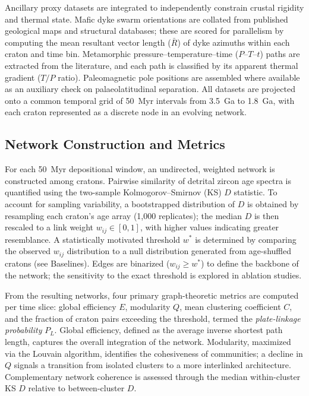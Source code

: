 \documentclass{article}
\begin{document}
Ancillary proxy datasets are integrated to independently constrain crustal rigidity and thermal state. Mafic dyke swarm orientations are collated from published geological maps and structural databases; these are scored for parallelism by computing the mean resultant vector length ($\bar{R}$) of dyke azimuths within each craton and time bin. Metamorphic pressure–temperature–time ($P$–$T$–$t$) paths are extracted from the literature, and each path is classified by its apparent thermal gradient ($T/P$ ratio). Paleomagnetic pole positions are assembled where available as an auxiliary check on palaeolatitudinal separation. All datasets are projected onto a common temporal grid of 50~Myr intervals from 3.5~Ga to 1.8~Ga, with each craton represented as a discrete node in an evolving network.

\subsection{Network Construction and Metrics}
For each 50~Myr depositional window, an undirected, weighted network is constructed among cratons. Pairwise similarity of detrital zircon age spectra is quantified using the two-sample Kolmogorov–Smirnov (KS) $D$ statistic. To account for sampling variability, a bootstrapped distribution of $D$ is obtained by resampling each craton's age array (1,000 replicates); the median $D$ is then rescaled to a link weight $w_{ij} \in [0,1]$, with higher values indicating greater resemblance. A statistically motivated threshold $w^*$ is determined by comparing the observed $w_{ij}$ distribution to a null distribution generated from age-shuffled cratons (see Baselines). Edges are binarized ($w_{ij} \geq w^*$) to define the backbone of the network; the sensitivity to the exact threshold is explored in ablation studies.

From the resulting networks, four primary graph-theoretic metrics are computed per time slice: global efficiency $E$, modularity $Q$, mean clustering coefficient $C$, and the fraction of craton pairs exceeding the threshold, termed the \emph{plate-linkage probability} $P_L$. Global efficiency, defined as the average inverse shortest path length, captures the overall integration of the network. Modularity, maximized via the Louvain algorithm, identifies the cohesiveness of communities; a decline in $Q$ signals a transition from isolated clusters to a more interlinked architecture. Complementary network coherence is assessed through the median within-cluster KS $D$ relative to between-cluster $D$.
\end{document}
